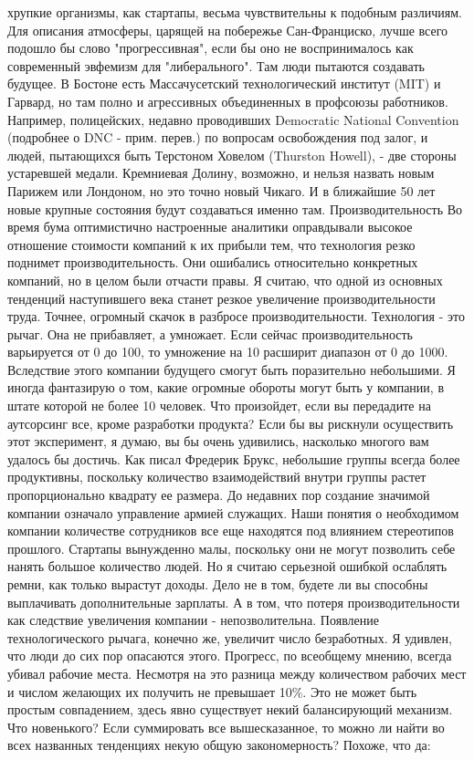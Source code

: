 \documentclass[ebook,12pt,oneside,openany]{memoir}
\begin{document}
хрупкие организмы, как стартапы, весьма чувствительны к подобным
различиям. Для описания атмосферы, царящей на побережье Сан-Франциско,
лучше всего подошло бы слово "прогрессивная", если бы оно не
воспринималось как современный эвфемизм для "либерального". Там люди
пытаются создавать будущее. В Бостоне есть Массачусетский
технологический институт (MIT) и Гарвард, но там полно и агрессивных
объединенных в профсоюзы работников. Например, полицейских, недавно
проводивших Democratic National Convention (подробнее о DNC - прим.
перев.) по вопросам освобождения под залог, и людей, пытающихся быть
Терстоном Ховелом (Thurston Howell), - две стороны устаревшей медали.
Кремниевая Долину, возможно, и нельзя назвать новым Парижем или
Лондоном, но это точно новый Чикаго. И в ближайшие 50 лет новые
крупные состояния будут создаваться именно там. Производительность Во
время бума оптимистично настроенные аналитики оправдывали высокое
отношение стоимости компаний к их прибыли тем, что технология резко
поднимет производительность. Они ошибались относительно конкретных
компаний, но в целом были отчасти правы. Я считаю, что одной из
основных тенденций наступившего века станет резкое увеличение
производительности труда. Точнее, огромный скачок в разбросе
производительности. Технология - это рычаг. Она не прибавляет, а
умножает. Если сейчас производительность варьируется от 0 до 100, то
умножение на 10 расширит диапазон от 0 до 1000. Вследствие этого
компании будущего смогут быть поразительно небольшими. Я иногда
фантазирую о том, какие огромные обороты могут быть у компании, в
штате которой не более 10 человек. Что произойдет, если вы передадите
на аутсорсинг все, кроме разработки продукта? Если бы вы рискнули
осуществить этот эксперимент, я думаю, вы бы очень удивились,
насколько многого вам удалось бы достичь. Как писал Фредерик Брукс,
небольшие группы всегда более продуктивны, поскольку количество
взаимодействий внутри группы растет пропорционально квадрату ее
размера. До недавних пор создание значимой компании означало
управление армией служащих. Наши понятия о необходимом компании
количестве сотрудников все еще находятся под влиянием стереотипов
прошлого. Стартапы вынужденно малы, поскольку они не могут позволить
себе нанять большое количество людей. Но я считаю серьезной ошибкой
ослаблять ремни, как только вырастут доходы. Дело не в том, будете ли
вы способны выплачивать дополнительные зарплаты. А в том, что потеря
производительности как следствие увеличения компании -
непозволительна. Появление технологического рычага, конечно же,
увеличит число безработных. Я удивлен, что люди до сих пор опасаются
этого. Прогресс, по всеобщему мнению, всегда убивал рабочие места.
Несмотря на это разница между количеством рабочих мест и числом
желающих их получить не превышает 10\%. Это не может быть простым
совпадением, здесь явно существует некий балансирующий механизм. Что
новенького? Если суммировать все вышесказанное, то можно ли найти во
всех названных тенденциях некую общую закономерность? Похоже, что да:
\end{document}
